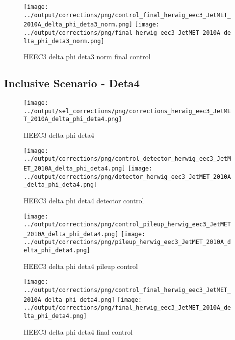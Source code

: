 \documentclass[11pt]{book}
\begin{document}
\begin{figure}[ht]
\centering
\texttt{[image: ../output/corrections/png/control\_final\_herwig\_eec3\_JetMET\_2010A\_delta\_phi\_deta3\_norm.png]}
\texttt{[image: ../output/corrections/png/final\_herwig\_eec3\_JetMET\_2010A\_delta\_phi\_deta3\_norm.png]}
\caption{HEEC3 delta phi deta3 norm final control}
\label{fig:HEEC3_JetMET_2010A_delta_phi_deta3_norm_final_control}
\end{figure}


\clearpage
\subsection{Inclusive Scenario - Deta4}

\begin{figure}[ht]
\centering
\texttt{[image: ../output/sel\_corrections/png/corrections\_herwig\_eec3\_JetMET\_2010A\_delta\_phi\_deta4.png]}
\caption{HEEC3 delta phi deta4}
\label{fig:HEEC3_JetMET_2010A_delta_phi_deta4}
\end{figure}


\begin{figure}[ht]
\centering
\texttt{[image: ../output/corrections/png/control\_detector\_herwig\_eec3\_JetMET\_2010A\_delta\_phi\_deta4.png]}
\texttt{[image: ../output/corrections/png/detector\_herwig\_eec3\_JetMET\_2010A\_delta\_phi\_deta4.png]}
\caption{HEEC3 delta phi deta4 detector control}
\label{fig:HEEC3_JetMET_2010A_delta_phi_deta4_detector_control}
\end{figure}

\begin{figure}[ht]
\centering
\texttt{[image: ../output/corrections/png/control\_pileup\_herwig\_eec3\_JetMET\_2010A\_delta\_phi\_deta4.png]}
\texttt{[image: ../output/corrections/png/pileup\_herwig\_eec3\_JetMET\_2010A\_delta\_phi\_deta4.png]}
\caption{HEEC3 delta phi deta4 pileup control}
\label{fig:HEEC3_JetMET_2010A_delta_phi_deta4_pileup_control}
\end{figure}


\begin{figure}[ht]
\centering
\texttt{[image: ../output/corrections/png/control\_final\_herwig\_eec3\_JetMET\_2010A\_delta\_phi\_deta4.png]}
\texttt{[image: ../output/corrections/png/final\_herwig\_eec3\_JetMET\_2010A\_delta\_phi\_deta4.png]}
\caption{HEEC3 delta phi deta4 final control}
\label{fig:HEEC3_JetMET_2010A_delta_phi_deta4_final_control}
\end{figure}
\end{document}
